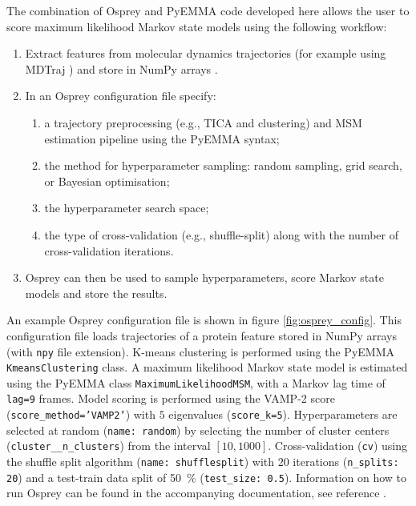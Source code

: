 The combination of Osprey and PyEMMA code developed here allows the user to score  maximum likelihood Markov state models using the following workflow: 
\begin{enumerate}
    \item Extract features from molecular dynamics trajectories (for example using MDTraj \cite{mcgibbonMDTrajModernOpen2015}) and store in NumPy arrays \cite{waltNumPyArrayStructure2011}.
    \item In an Osprey configuration file specify:
    \begin{enumerate}
        \item a trajectory preprocessing (e.g., TICA and clustering) and MSM estimation pipeline using the PyEMMA syntax;
        \item the method for hyperparameter sampling: random sampling, grid search, or Bayesian optimisation;
        \item the hyperparameter search space;
        \item the type of cross-validation (e.g., shuffle-split) along with the number of cross-validation iterations. 
    \end{enumerate}
    \item Osprey can then be used to sample hyperparameters, score Markov state models and store the results. 
\end{enumerate}

An example Osprey configuration file is shown in figure \ref{fig:osprey_config}.  This configuration file loads trajectories of a protein feature stored in NumPy \cite{waltNumPyArrayStructure2011} arrays (with \texttt{npy} file extension). K-means clustering is performed using the PyEMMA \texttt{KmeansClustering} class.  A maximum likelihood Markov state model is estimated using the PyEMMA class \texttt{MaximumLikelihoodMSM},  with a Markov lag time of \texttt{lag=9} frames. Model scoring is performed using the VAMP-2 score (\texttt{score\_method='VAMP2'}) with $5$ eigenvalues (\texttt{score\_k=5}). Hyperparameters are selected at random (\texttt{name: random}) by selecting the number of cluster centers (\texttt{cluster\_\_n\_clusters}) from the interval $[10, 1000]$. Cross-validation (\texttt{cv}) using the shuffle split algorithm (\texttt{name: shufflesplit}) with 20 iterations (\texttt{n\_splits: 20}) and a test-train data split of \SI{50}{\percent} (\texttt{test\_size: 0.5}).  Information on how to run Osprey can be found in the accompanying documentation, see reference \cite{mcgibbonOspreyHyperparameterOptimization2016}. 


